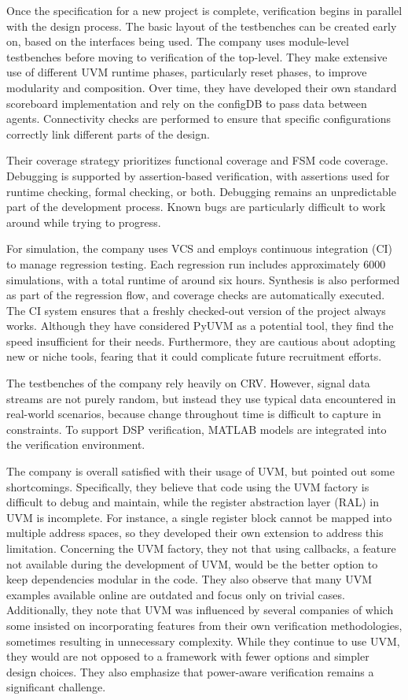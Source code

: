 \documentclass[12pt]{book}
\begin{document}
Once the specification for a new project is complete, verification begins in parallel with the design process. The
basic layout of the testbenches can be created early on, based on the interfaces being used. The company uses
module-level testbenches before moving to verification of the top-level. They make extensive use of different UVM
runtime phases, particularly reset phases, to improve modularity and composition. Over time, they have developed
their own standard scoreboard implementation and rely on the configDB to pass data between agents. Connectivity
checks are performed to ensure that specific configurations correctly link different parts of the design.

Their coverage strategy prioritizes functional coverage and FSM code coverage. Debugging is supported by
assertion-based verification, with assertions used for runtime checking, formal checking, or both. Debugging remains
an unpredictable part of the development process. Known bugs are particularly difficult to work around while trying to progress.

For simulation, the company uses VCS and employs continuous integration (CI) to manage regression testing. Each
regression run includes approximately 6000 simulations, with a total runtime of around six hours. Synthesis is also
performed as part of the regression flow, and coverage checks are automatically executed. The CI system ensures that
a freshly checked-out version of the project always works. Although they have considered PyUVM as a potential tool,
they find the speed insufficient for their needs. Furthermore, they are cautious about adopting new or niche tools,
fearing that it could complicate future recruitment efforts.

The testbenches of the company rely heavily on CRV. However, signal data streams are not purely random, but instead
they use typical data encountered in real-world scenarios, because change throughout time is difficult to capture in
constraints. To support DSP verification, MATLAB models are integrated into the verification environment.

The company is overall satisfied with their usage of UVM, but pointed out some shortcomings. Specifically, they
believe that code using the UVM factory is difficult to debug and maintain, while the register abstraction layer
(RAL) in UVM is incomplete. For instance, a single register block cannot be mapped into multiple address spaces, so
they developed their own extension to address this limitation. Concerning the UVM factory, they not that using
callbacks, a feature not available during the development of UVM, would be the better option to keep dependencies
modular in the code. They also observe that many UVM examples available online are outdated and focus only on trivial
cases. Additionally, they note that UVM was influenced by several companies of which some insisted on incorporating
features from their own verification methodologies, sometimes resulting in unnecessary complexity. While they
continue to use UVM, they would are not opposed to a framework with fewer options and simpler design choices. They
also emphasize that power-aware verification remains a significant challenge.
\end{document}
